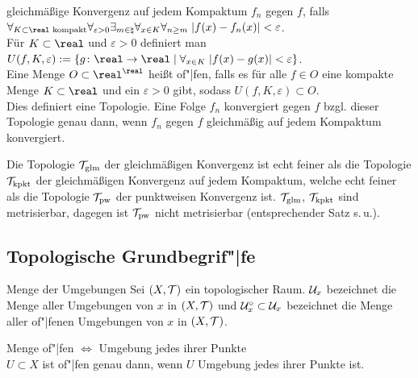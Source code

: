 \begin{Def}{gleichmäßige Konvergenz auf jedem Kompaktum}
    $f_n$  gegen $f$,
    falls $\forall_{K \subset \real \text{ kompakt}} \forall_{\varepsilon > 0}
    \exists_{m \in \natural} \forall_{x \in K} \forall_{n \ge m}\;
    |f(x) - f_n(x)| < \varepsilon$. \\
    Für $K \subset \real$ und $\varepsilon > 0$ definiert man
    $U(f, K, \varepsilon) := \{g\colon \real \rightarrow \real \;|\;
    \forall_{x \in K}\; |f(x) - g(x)| < \varepsilon\}$. \\
    Eine Menge $O \subset \real^\real$ heißt of"|fen, falls es für alle
    $f \in O$ eine kompakte Menge $K \subset \real$ und ein $\varepsilon > 0$
    gibt, sodass $U(f, K, \varepsilon) \subset O$. \\
    Dies definiert eine Topologie.
    Eine Folge $f_n$ konvergiert gegen $f$ bzgl. dieser Topologie genau dann,
    wenn $f_n$ gegen $f$ gleichmäßig auf jedem Kompaktum konvergiert.
\end{Def}

\linie

\begin{Bem}
    Die Topologie $\mathcal{T}_{\text{glm}}$ der gleichmäßigen Konvergenz ist echt feiner
    als die Topologie $\mathcal{T}_{\text{kpkt}}$ der gleichmäßigen Konvergenz auf jedem
    Kompaktum, welche echt feiner als die Topologie $\mathcal{T}_{\text{pw}}$ der
    punktweisen Konvergenz ist.
    $\mathcal{T}_{\text{glm}}$, $\mathcal{T}_{\text{kpkt}}$ sind metrisierbar, dagegen ist
    $\mathcal{T}_{\text{pw}}$ nicht metrisierbar (entsprechender Satz s.\,u.).
\end{Bem}

\pagebreak

\subsection{%
    Topologische Grundbegrif"|fe%
}

\begin{Def}{Menge der Umgebungen}
    Sei $(X, \mathcal{T})$ ein topologischer Raum.
    $\mathcal{U}_x$ bezeichnet die Menge aller Umgebungen von $x$ in $(X, \mathcal{T})$ und
    $\mathcal{U}_x^\circ \subset \mathcal{U}_x$ bezeichnet die Menge aller of"|fenen Umgebungen
    von $x$ in $(X, \mathcal{T})$.
\end{Def}

\begin{Lemma}{Menge of"|fen $\Leftrightarrow$ Umgebung jedes ihrer Punkte}\\
    $U \subset X$ ist of"|fen genau dann, wenn $U$ Umgebung jedes ihrer
    Punkte ist.
\end{Lemma}

